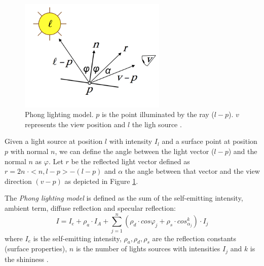 \begin{figure}[h!]
  \centering
  \includegraphics[width=7cm]{images/lighting}
\caption{Phong lighting model. $p$ is the point illuminated by the ray ($l-p$). $v$ represents the view position and $l$ the ligh source \cite{SLIDE:ICORSI}.} \label{figure:lighting}
\end{figure}
Given a light source at position $l$ with intensity $I_l$ and a surface point at position $p$ with normal $n$,
we can define the angle between the light vector ($l-p$) and the normal $n$ as $\varphi$.
Let $r$ be the reflected light vector defined as $r = 2 n \; \cdot <n, l - p> - (l-p)$ and $\alpha$ the angle between that vector and the view direction $(v - p)$ as depicted in Figure \ref{figure:lighting}.

The \textit{Phong lighting model} is defined as the sum of the self-emitting intensity, ambient term, diffuse reflection and specular reflection:
$$ I = I_e + {\rho}_a \cdot I_A + \sum_{j=1}^n ({\rho}_d \cdot cos {\varphi}_j + {\rho}_s \cdot cos_{\alpha_j}^k) \cdot I_j$$ where $I_e$ is the self-emitting intensity, ${\rho}_a, {\rho}_d, {\rho}_s$ are the reflection constants (surface properties), $n$ is the number of lights sources with intensities $I_j$ and $k$ is the shininess \cite{SLIDE:ICORSI}.


